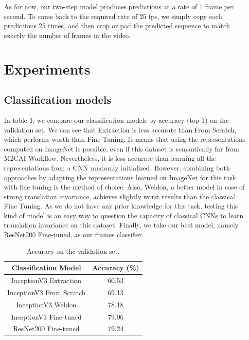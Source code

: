 \documentclass[10pt,twocolumn,letterpaper]{article}
\begin{document}
As for now, our two-step model produces predictions at a rate of 1 frame per second. To come back to the required rate of 25 fps, we simply copy each predictions 25 times, and
then crop or pad the predicted sequence to match exactly the number of frames in the video.

\section{Experiments}

\subsection{Classification models}

In table 1, we compare our classification models by accuracy (top 1) on the validation set. We can see that Extraction is less accurate than From Scratch, which performs worth than Fine Tuning. It means that using the representations computed on ImageNet is possible, even if this dataset is semantically far from M2CAI Workflow. Nevertheless, it is less accurate than learning all the representations from a CNN randomly initialized. However, combining both approaches by adapting the representations learned on ImageNet for this task with fine tuning is the method of choice. Also, Weldon, a better model in case of strong translation invariance, achieves slightly worst results than the classical Fine Tuning. As we do not have any prior knowledge for this task, testing this kind of model is an easy way to question the capacity of classical CNNs to learn translation invariance on this dataset. Finally, we take our best model, namely ResNet200 Fine-tuned, as our frames classifier.

\begin{table}
	\begin{center}
		\begin{tabular}{|c|c|}
			\hline
			Classification Model & Accuracy (\%) \\
			\hline\hline
			InceptionV3 Extraction & 60.53 \\
			InceptionV3 From Scratch & 69.13 \\
			InceptionV3 Weldon & 78.18 \\
			InceptionV3 Fine-tuned & 79.06 \\
			ResNet200 Fine-tuned & 79.24 \\
			\hline
		\end{tabular}
	\end{center}
	\caption{Accuracy on the validation set.}
\end{table}
\end{document}
